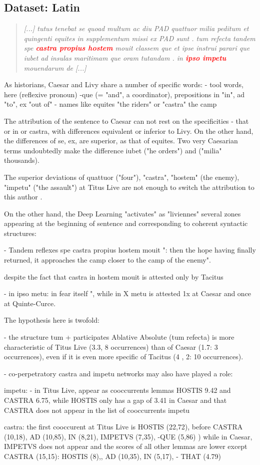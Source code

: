 \subsection{Dataset: Latin}

\begin{quote}
\textit{[...] tutus tenebat se quoad multum ac diu PAD quattuor milia peditum et quingenti equites in supplementum missi ex PAD sunt . tum refecta tandem spe \textcolor{red}{\textbf{castra propius hostem}} mouit classem que et ipse instrui parari que iubet ad insulas maritimam que oram tutandam . in \textcolor{red}{\textbf{ipso impetu}} mouendarum de [...]} 
\end{quote}

As historians, Caesar and Livy share a number of specific words:
- tool words, here (reflexive pronoun) -que (= "and", a coordinator), prepositions in "in", ad "to", ex "out of"
- names like equites "the riders" or "castra" the camp

The attribution of the sentence to Caesar can not rest on the specificities - that or in or castra, with differences equivalent or inferior to Livy. On the other hand, the differences of se, ex, are superior, as that of equites. Two very Caesarian terms undoubtedly make the difference iubet ("he orders") and ("milia" thousands).

The superior deviations of quattuor ("four"), "castra", "hostem" (the enemy), "impetu" ("the assault") at Titus Live are not enough to switch the attribution to this author .

On the other hand, the Deep Learning "activates" as "liviennes" several zones appearing at the beginning of sentence and corresponding to coherent syntactic structures:

- Tandem reflexes spe castra propius hostem mouit ": then the hope having finally returned, it approaches the camp closer to the camp of the enemy".

despite the fact that castra in hostem mouit is attested only by Tacitus

- in ipso metu: in fear itself ", while in X metu is attested 1x at Caesar and once at Quinte-Curce.

The hypothesis here is twofold:

- the structure tum + participates Ablative Absolute (tum refecta) is more characteristic of Titus Live (3.3, 8 occurrences) than of Caesar (1.7: 3 occurrences), even if it is even more specific of Tacitus (4 , 2: 10 occurrences).

- co-perpetratory castra and impetu networks may also have played a role:

impetu:
- in Titus Live, appear as cooccurrents lemmas HOSTIS 9.42 and CASTRA 6.75, while HOSTIS only has a gap of 3.41 in Caesar and that CASTRA does not appear in the list of cooccurrents impetu

castra:
the first cooccurent at Titus Live is HOSTIS (22,72), before CASTRA (10,18), AD (10,85), IN (8,21), IMPETVS (7,35), -QUE (5,86) )
while in Caesar, IMPETVS does not appear and the scores of all other lemmas are lower except CASTRA (15,15): HOSTIS (8),, AD (10,35), IN (5,17), - THAT (4.79)

